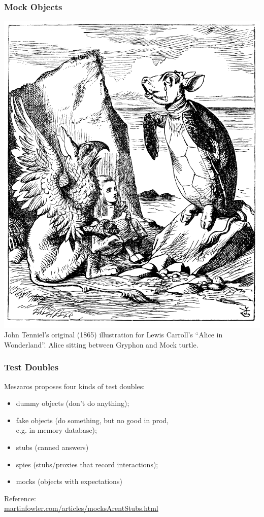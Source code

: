 \documentclass{beamer}
\newenvironment{changemargin}[1]{%
  \begin{list}{}{%
    \setlength{\topsep}{0pt}%
    \setlength{\leftmargin}{#1}%
    \setlength{\rightmargin}{1em}
    \setlength{\listparindent}{\parindent}%
    \setlength{\itemindent}{\parindent}%
    \setlength{\parsep}{\parskip}%
  }%
  \item[]}{\end{list}}
\begin{document}
\begin{frame}
  \frametitle{Mock Objects}
  \begin{center}
    \includegraphics[height=.8\textheight]{L26/Alice_par_John_Tenniel_34.png}\\
John Tenniel's original (1865) illustration for Lewis Carroll's ``Alice in Wonderland''. Alice sitting between Gryphon and Mock turtle.
  \end{center}
\end{frame}

\begin{frame}
  \frametitle{Test Doubles}
  \begin{changemargin}{1cm}
    Meszaros proposes four kinds of test doubles:
    \begin{itemize}
    \item dummy objects (don't do anything);
    \item fake objects (do something, but no good in prod, \\ \hspace*{3cm} e.g. in-memory database);
    \item stubs (canned answers)
    \item spies (stubs/proxies that record interactions);
      \item mocks (objects with expectations)
    \end{itemize}
    Reference: \\ \url{martinfowler.com/articles/mocksArentStubs.html}
\end{changemargin}
\end{frame}
\end{document}
